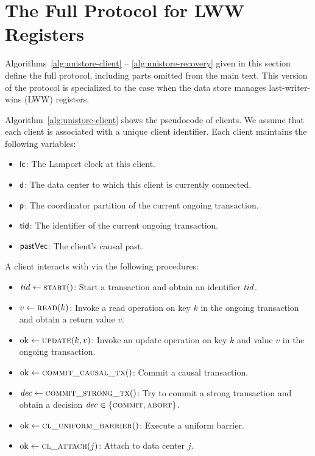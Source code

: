
\section{The Full \unistore{} Protocol for LWW Registers} \label{section:unistore-protocol}

Algorithms~\ref{alg:unistore-client} -- \ref{alg:unistore-recovery} given in
this section define the full \unistore{} protocol, including parts omitted from
the main text. This version of the protocol is specialized to the case when the
data store manages last-writer-wins (LWW) registers.

Algorithm~\ref{alg:unistore-client} shows the pseudocode of clients.
We assume that each client is associated with a unique client identifier.
Each client maintains the following variables:
\begin{itemize}
  \item ${\sf lc}$: The Lamport clock at this client.
  \item ${\sf d}$: The data center to which this client is currently connected.
  \item ${\sf p}$: The coordinator partition of the current ongoing transaction.
  \item ${\sf tid}$: The identifier of the current ongoing transaction.
  \item ${\sf pastVec}$: The client's causal past.
\end{itemize}

A client interacts with \unistore{} via the following procedures:
\begin{itemize}
  \item $\tidvar \gets \Call{\start}{\null}$:
    Start a transaction and obtain an identifier $\mathit{tid}$.
  \item $v \gets \Call{\read}{k}$:
    Invoke a read operation on key $k$ in the ongoing transaction and obtain a
    return value $v$.
  \item $\ok \gets \Call{\updateproc}{k, v}$:
    Invoke an update operation on key $k$ and value $v$
    in the ongoing transaction.
  \item $\ok \gets \Call{\commitcausaltx}{\null}$:
    Commit a causal transaction.
  \item $\decvar \gets \Call{\commitstrongtx}{\null}$:
    Try to commit a strong transaction
    and obtain a decision $\mathit{dec} \in \{\textsc{commit}, \textsc{abort}\}$.
  \item $\ok \gets \Call{\fence}{\null}$:
    Execute a uniform barrier.
  \item $\ok \gets \Call{\clattach}{j}$:
    Attach to data center $j$.
\end{itemize}


